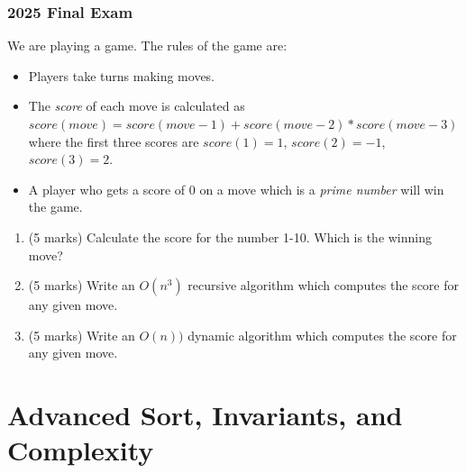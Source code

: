 \documentclass[twoside=false,DIV=14]{scrartcl}
\begin{document}
\newpage

\section{2025 Final Exam}
We are playing a game.  The rules of the game are:
\begin{itemize}
    \item Players take turns making moves.
    \item The \emph{score} of each move is calculated as $score(move) = score(move-1) + score(move -2)*score(move-3)$ where the first three scores are $score(1) = 1$, $score(2) = -1$, $score(3) = 2$.
    \item A player who gets a score of $0$ on a move which is a \emph{prime number} will win the game.
\end{itemize}

\begin{enumerate}
\item (5 marks) Calculate the score for the number 1-10.  Which is the winning move?
\item (5 marks) Write an $O(n^3)$ recursive algorithm which computes the score for any given move.
\item (5 marks) Write an $O(n))$ dynamic algorithm which computes the score for any given move.
\end{enumerate}

 

\newpage\setcounter{section}{0}
\part*{Advanced Sort, Invariants, and Complexity}
\end{document}
